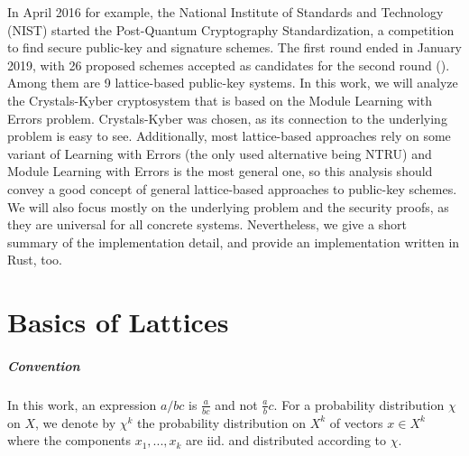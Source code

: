 \documentclass{report}
\begin{document}
In April 2016 for example, the National Institute of Standards and Technology (NIST) started the Post-Quantum Cryptography Standardization, a competition to find secure public-key and signature schemes. The first round ended in January 2019, with 26 proposed schemes accepted as candidates for the second round (\cite{NISTReportFirstRound}). Among them are 9 lattice-based public-key systems. In this work, we will analyze the Crystals-Kyber cryptosystem that is based on the Module Learning with Errors problem. Crystals-Kyber was chosen, as its connection to the underlying problem is easy to see. Additionally, most lattice-based approaches rely on some variant of Learning with Errors (the only used alternative being NTRU) and Module Learning with Errors is the most general one, so this analysis should convey a good concept of general lattice-based approaches to public-key schemes. We will also focus mostly on the underlying problem and the security proofs, as they are universal for all concrete systems. Nevertheless, we give a short summary of the implementation detail, and provide an implementation written in Rust, too.

\chapter{Basics of Lattices}

\paragraph{Convention} In this work, an expression $a/bc$ is $\frac a {bc}$ and not $\frac a b c$. For a probability distribution $\chi$ on $X$, we denote by $\chi^k$ the probability distribution on $X^k$ of vectors $x \in X^k$ where the components $x_1, ..., x_k$ are iid. and distributed according to $\chi$.
\end{document}
